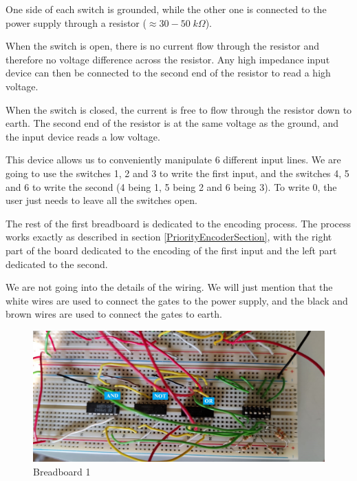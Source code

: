 \documentclass{article}
\begin{document}
One side of each switch is grounded, while the other one is connected to the power supply through a resistor ($\approx 30-50 \; k \Omega$). 

\vspace{3mm}

When the switch is open, there is no current flow through the resistor and therefore no voltage difference across the resistor. Any high impedance input device can then be connected to the second end of the resistor to read a high voltage.

\vspace{3mm}

When the switch is closed, the current is free to flow through the resistor down to earth. The second end of the resistor is at the same voltage as the ground, and the input device reads a low voltage.

\vspace{3mm}

This device allows us to conveniently manipulate 6 different input lines. We are going to use the switches 1, 2 and 3 to write the first input, and the switches 4, 5 and 6 to write the second (4 being 1, 5 being 2 and 6 being 3). To write 0, the user just needs to leave all the switches open.

\vspace{3mm}

The rest of the first breadboard is dedicated to the encoding process. The process works exactly as described in section \ref{PriorityEncoderSection}, with the right part of the board dedicated to the encoding of the first input and the left part dedicated to the second.

\vspace{3mm}

We are not going into the details of the wiring. We will just mention that the white wires are used to connect the gates to the power supply, and the black and brown wires are used to connect the gates to earth.

\begin{figure}[h]
  \centering
  \includegraphics[width=\linewidth]{breadboard1}
  \caption{Breadboard 1}
  \label{breadboard1}
\end{figure}
\end{document}
